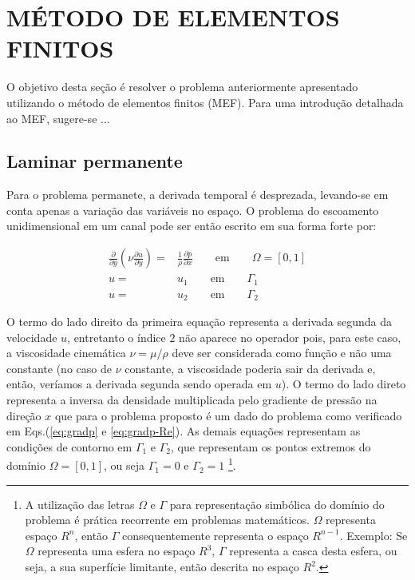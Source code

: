 \typeout{ ====================================================================}
\typeout{ ====================================================================}


\section{MÉTODO DE ELEMENTOS FINITOS}

O objetivo desta seção é resolver o problema anteriormente apresentado
utilizando o método de elementos finitos (MEF). Para uma introdução
detalhada ao MEF, sugere-se ...

\subsection{Laminar permanente}

Para o problema permanete, a derivada temporal é desprezada, levando-se
em conta apenas a variação das variáveis no espaço. O problema do 
escoamento unidimensional em um canal pode ser então escrito em sua
forma forte por:

\begin{align}
	\frac{\partial}{\partial y} \left(\nu \frac{\partial u}
	{\partial y}\right)
	=&
	\frac{1}{\rho} \frac{\partial p}{\partial x}
	\qquad
	\text{em}
	\qquad
	\Omega=[0,1]
	\\
	u =& u_1 \qquad \text{em} \qquad \Gamma_1
	\\
	u =& u_2 \qquad \text{em} \qquad \Gamma_2
\label{eq:mef1}
\end{align}

O termo do lado direito da primeira equação representa a derivada
segunda da velocidade $u$, entretanto o índice $2$ não aparece no
operador pois, para este caso, a viscosidade cinemática $\nu=\mu/\rho$
deve ser considerada como função e não uma constante (no caso de $\nu$
constante, a viscosidade poderia sair da derivada e, então, veríamos a
derivada segunda sendo operada em $u$). O termo do lado direto
representa a inversa da densidade multiplicada pelo gradiente de pressão
na direção $x$ que para o problema proposto é um dado do problema como
verificado em Eqs.(\ref{eq:gradp} e \ref{eq:gradp-Re}). As demais
equações representam as condições de contorno em $\Gamma_1$ e
$\Gamma_2$, que representam os pontos extremos do domínio
$\Omega=[0,1]$, ou seja $\Gamma_1 = 0$ e $\Gamma_2 = 1$ \footnote{A
utilização das letras $\Omega$ e $\Gamma$ para representação simbólica do
domínio do problema é prática recorrente em problemas matemáticos.
$\Omega$ representa espaço $R^n$, então $\Gamma$ consequentemente representa
o espaço $R^{n-1}$. Exemplo: Se $\Omega$ representa uma esfera no espaço
$R^3$, $\Gamma$ representa a casca desta esfera, ou seja, a sua superfície
limitante, então descrita no espaço $R^2$.}.

